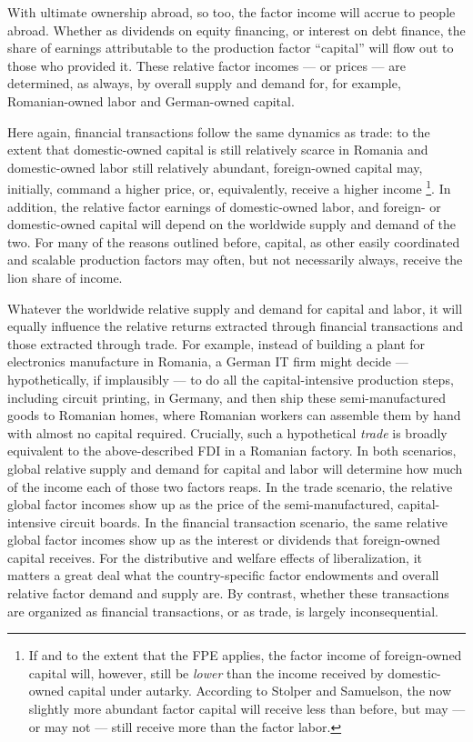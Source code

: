 \documentclass[11pt,a4paper,oneside,openright]{article}
\begin{document}
\begin{enumerate}
	With ultimate ownership abroad, so too, the factor income will accrue to people abroad. 
	Whether as dividends on equity financing, or interest on debt finance, the share of earnings attributable to the production factor ``capital'' will flow out to those who provided it. 
	These relative factor incomes --- or prices --- are determined, as always, by overall supply and demand for, for example, Romanian-owned labor and German-owned capital. 
	
	Here again, financial transactions follow the same dynamics as trade: 
	to the extent that domestic-owned capital is still relatively scarce in Romania and domestic-owned labor still relatively abundant, foreign-owned capital may, initially, command a higher price, or, equivalently, receive a higher income
	\footnote{
		If and to the extent that the \gls{FPE} applies, the factor income of foreign-owned capital will, however, still be \emph{lower} than the income received by domestic-owned capital under autarky. 
		According to Stolper and Samuelson, the now slightly more abundant factor capital will receive less than before, but may --- or may not --- still receive more than the factor labor.
	}.
	In addition, the relative factor earnings of domestic-owned labor, and foreign- or domestic-owned capital will depend on the worldwide supply and demand of the two. 
	For many of the reasons outlined before, capital, as other easily coordinated and scalable production factors may often, but not necessarily always, receive the lion share of income. %
	
	Whatever the worldwide relative supply and demand for capital and labor, it will equally influence the relative returns extracted through financial transactions and those extracted through trade. 
	For example, instead of building a plant for electronics manufacture in Romania, a German IT firm might decide --- hypothetically, if implausibly --- to do all the capital-intensive production steps, including circuit printing, in Germany, and then ship these semi-manufactured goods to Romanian homes, where Romanian workers can assemble them by hand with almost no capital required. 
	Crucially, such a hypothetical \emph{trade} is broadly equivalent to the above-described \gls{FDI} in a Romanian factory. 
	In both scenarios, global relative supply and demand for capital and labor will determine how much of the income each of those two factors reaps. 
	In the trade scenario, the relative global factor incomes show up as the price of the semi-manufactured, capital-intensive circuit boards. 
	In the financial transaction scenario, the same relative global factor incomes show up as the interest or dividends that foreign-owned capital receives. 
	For the distributive and welfare effects of liberalization, it matters a great deal what the country-specific factor endowments and overall relative factor demand and supply are. 
	By contrast, whether these transactions are organized as financial transactions, or as trade, is largely inconsequential.
	
\end{enumerate}
\end{document}
